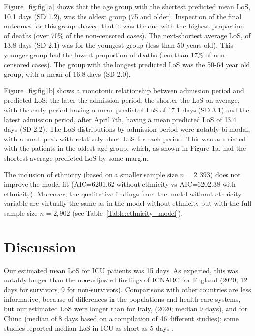 \documentclass[review]{elsarticle}
\begin{document}
Figure~\ref{fig:fig1a} shows that the age group with the shortest predicted mean LoS, 10.1 days (SD 1.2), was the oldest group (75 and older). Inspection of the final outcomes for this group showed that it was the one with the highest proportion of deaths (over 70\% of the non-censored cases). The next-shortest average LoS, of 13.8 days (SD 2.1) was for the youngest group (less than 50 years old). This younger group had the lowest proportion of deaths (less than 17\% of non-censored cases). The group with the longest predicted LoS was the 50-64 year old group, with a mean of 16.8 days (SD 2.0). 

Figure~\ref{fig:fig1b} shows a monotonic relationship between admission period and predicted LoS; the later the admission period, the shorter the LoS on average, with the early period having a mean predicted LoS of 17.1 days (SD 3.1) and the latest admission period, after April 7th, having a mean predicted LoS of 13.4 days (SD 2.2). The LoS distributions by admission period were notably bi-modal, with a small peak with relatively short LoS for each period. This was associated with the patients in the oldest age group, which, as shown in Figure 1a, had the shortest average predicted LoS by some margin. 

The inclusion of ethnicity (based on a smaller sample size $n=2,393$) does not improve the model fit (AIC=6201.62 without ethnicity vs AIC=6202.38 with ethnicity). Moreover, the qualitative findings from the model without ethnicity variable are virtually the same as in the model without ethnicity but with the full sample size $n=2,902$ (see Table~\ref{Table:ethnicity_model}).

\section{Discussion}

Our estimated mean LoS for ICU patients was 15 days. As expected, this was notably longer than the non-adjusted findings of ICNARC for England (2020; 12 days for survivors, 9 for non-survivors). Comparisons with other countries are less informative, because of differences in the populations and health-care systems, but our estimated LoS were longer than \cite{grasselli2020critical} for Italy, (2020; median 9 days), and \cite{Rees2020.04.30.20084780} 
for China (median of 8 days based on a compilation of 46 different studies); some studies reported median LoS in ICU as short as 5 days \citep{thomas2020coronavirus,wang2020clinical}.  
\end{document}
